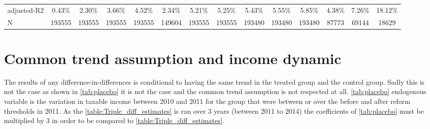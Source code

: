 \begin{subappendices}
{\begin{landscape}
\begin{table}[H]
{\begin{tabular}{lccccccccccccc}
adjusted-R2                              & 0.43\%              & 2.30\%                   & 3.66\%                            & 4.52\%       & 2.34\%                    & 5.21\%             & 5.25\%       & 5.43\%                & 5.55\%                   & 5.85\%                    & 4.38\%                 & 7.26\%                     & 18.12\%        \\
N                                        & 193555             & 193555                  & 193555                           & 193555      & 149604                   & 193555            & 193555      & 193480               & 193480                  & 193480                   & 87773                 & 69144                     & 18629                      \\
\bottomrule
\end{tabular}
}
\end{table}   
\end{landscape}
}
\restoregeometry 




\section{Common trend assumption and income dynamic}

 
The results of any difference-in-differences is conditional to having the same trend in the treated group and the control group. Sadly this is not the case as shown in \autoref{tab:placebo} it is not the case and the common trend assumption is not respected at all. \autoref{tab:placebo} endogenous variable is the variation in taxable income between 2010 and 2011 for the group that were between or over the before and after reform thresholds in 2011.  As the \autoref{table:Triple_diff_estimates} is ran over 3 years (between 2011 to 2014) the coefficients of \autoref{tab:placebo} must be multiplied by 3 in order to be compared to \autoref{table:Triple_diff_estimates}. 

\begin{table}[H]
\caption{Placebo: Change in taxable income between 2010 and 2011}
\label{tab:placebo}
\center
{}
\end{table}
\end{subappendices}
